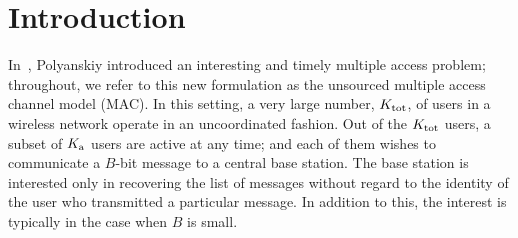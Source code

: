 \newif\iflonger
\longerfalse

\def\Figurespath{./data/MA}



\section{Introduction}
In~\cite{polyanskiy2017perspective}, Polyanskiy introduced an interesting and timely multiple access problem; throughout, we refer to this new formulation as the unsourced multiple access channel model (MAC). In this setting, a very large number, $K_{\text{tot}}$, of users in a wireless network operate in an uncoordinated fashion. Out of the $K_{\text{tot}}$ users, a subset of $K_{\text{a}}$ users are active at any time; and each of them wishes to communicate a $B$-bit message to a central base station. The base station is interested only in recovering the list of messages without regard to the identity of the user who transmitted a particular message. In addition to this, the interest is typically in the case when $B$ is small.

